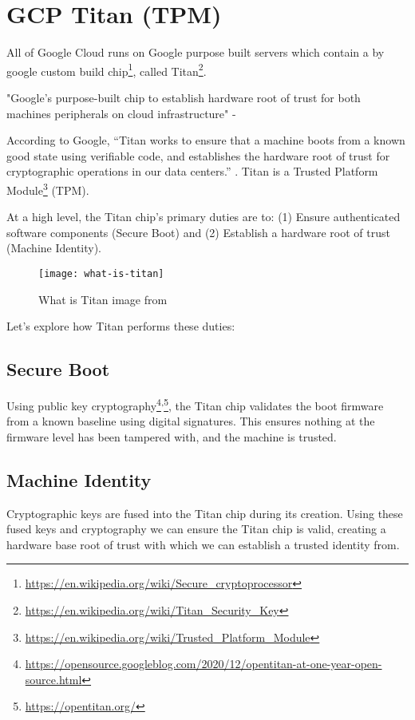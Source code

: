 
\section{GCP Titan (TPM)}

All of Google Cloud runs on Google purpose built servers 
which contain a by google custom build chip\footnote{\url{https://en.wikipedia.org/wiki/Secure_cryptoprocessor}}, called Titan\footnote{\url{https://en.wikipedia.org/wiki/Titan_Security_Key}}. 

"Google's purpose-built chip to establish hardware root of trust 
for both machines peripherals on cloud infrastructure" - 
\cite{holzle_bolstering_2017}

According to Google,
 “Titan works to ensure that a machine boots from a known good state 
 using verifiable code, and establishes the hardware root of trust 
 for cryptographic operations in our data centers.” \cite{savagaonkar_titan_2017}.
 Titan is a 
 Trusted Platform Module\footnote{\url{https://en.wikipedia.org/wiki/Trusted_Platform_Module}} 
 (TPM).

At a high level, the Titan chip’s primary duties are to:
(1) Ensure authenticated software components (Secure Boot) and
(2) Establish a hardware root of trust (Machine Identity).

\begin{figure}[!ht]
    \centering
    \texttt{[image: what-is-titan]}
    \caption{What is Titan image from \cite{johnson_titan_2018}}
    \label{fig:what-is-titan}
\end{figure}

Let's explore how Titan performs these duties:

\subsection{Secure Boot}
Using public key cryptography\footnote{\url{https://opensource.googleblog.com/2020/12/opentitan-at-one-year-open-source.html}}\textsuperscript{,}\footnote{\url{https://opentitan.org/}}, 
the Titan chip validates the boot firmware from a known baseline using digital signatures. 
This ensures nothing at the firmware level has been tampered with, and the machine is trusted.

\subsection{Machine Identity}
Cryptographic keys are fused into the Titan chip during its creation. 
Using these fused keys and cryptography we can ensure the Titan chip is valid, 
creating a hardware base root of trust with which we can establish a trusted identity from.

